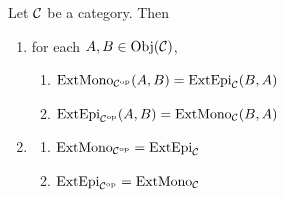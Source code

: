 \documentclass{book}
\begin{document}
	\begin{ex}
		Let $\mathcal{C}$ be a category. Then
		\begin{enumerate}
			\item for each $A,B \in \operatorname{Obj}(\mathcal{C})$,
			\begin{enumerate}
				\item $\operatorname{ExtMono}_{{\mathcal{C}}^{\text{op}}}(A,B) = \operatorname{ExtEpi}_{\mathcal{C}}(B,A)$
				\item $\operatorname{ExtEpi}_{{\mathcal{C}}^{\text{op}}}(A,B) = \operatorname{ExtMono}_{\mathcal{C}}(B,A)$
			\end{enumerate}
			\item 
			\begin{enumerate}
				\item $\operatorname{ExtMono}_{{\mathcal{C}}^{\text{op}}} = \operatorname{ExtEpi}_{\mathcal{C}}$
				\item $\operatorname{ExtEpi}_{{\mathcal{C}}^{\text{op}}} = \operatorname{ExtMono}_{\mathcal{C}}$
			\end{enumerate}
		\end{enumerate}
	\end{ex}
	
\end{document}
